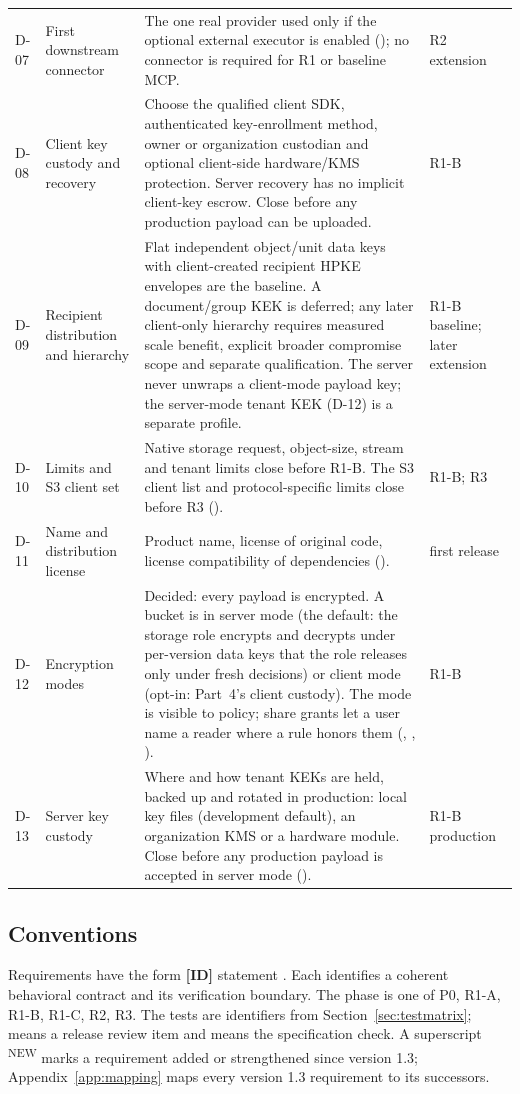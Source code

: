 \begin{longtable}{@{}P{0.06\textwidth}P{0.22\textwidth}P{0.46\textwidth}P{0.12\textwidth}@{}}
D-07 & First downstream connector & The one real provider used only if the optional external executor is enabled (); no connector is required for R1 or baseline MCP. & R2 extension\\
D-08 & Client key custody and recovery & Choose the qualified client SDK, authenticated key-enrollment method, owner or organization custodian and optional client-side hardware/KMS protection. Server recovery has no implicit client-key escrow. Close before any production payload can be uploaded. & R1-B\\
D-09 & Recipient distribution and hierarchy & Flat independent object/unit data keys with client-created recipient HPKE envelopes are the baseline. A document/group KEK is deferred; any later client-only hierarchy requires measured scale benefit, explicit broader compromise scope and separate qualification. The server never unwraps a client-mode payload key; the server-mode tenant KEK (D-12) is a separate profile. & R1-B baseline; later extension\\
D-10 & Limits and S3 client set & Native storage request, object-size, stream and tenant limits close before R1-B. The S3 client list and protocol-specific limits close before R3 (). & R1-B; R3\\
D-11 & Name and distribution license & Product name, license of original code, license compatibility of dependencies (). & first release\\
D-12 & Encryption modes & Decided: every payload is encrypted. A bucket is in server mode (the default: the storage role encrypts and decrypts under per-version data keys that the  role releases only under fresh decisions) or client mode (opt-in: Part~4's client custody). The mode is visible to policy; share grants let a user name a reader where a rule honors them (, , ). & R1-B\\
D-13 & Server key custody & Where and how tenant KEKs are held, backed up and rotated in production: local key files (development default), an organization KMS or a hardware module. Close before any production payload is accepted in server mode (). & R1-B production\\
\bottomrule
\end{longtable}

\subsection{Conventions}
Requirements have the form \textbf{[ID]} statement . Each identifies a coherent behavioral contract and its verification boundary. The phase is one of P0, R1-A, R1-B, R1-C, R2, R3. The tests are identifiers from Section~\ref{sec:testmatrix};  means a release review item and  means the specification check. A superscript \textsuperscript{\color{accent}\tiny NEW} marks a requirement added or strengthened since version 1.3; Appendix~\ref{app:mapping} maps every version 1.3 requirement to its successors.

